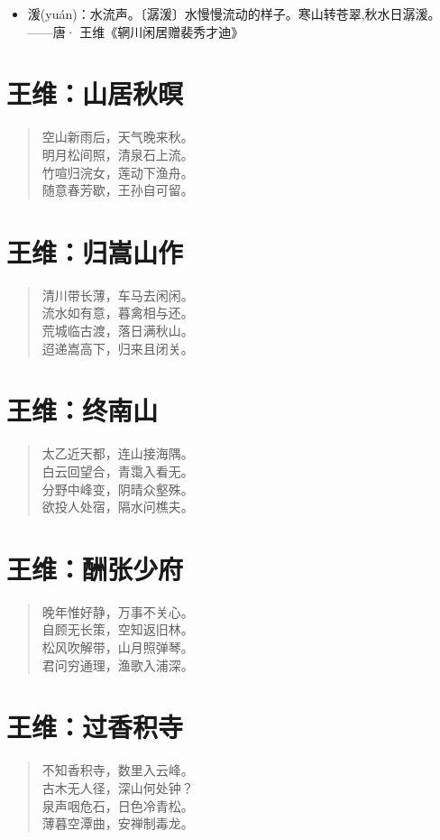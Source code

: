 \documentclass[12pt,oneside]{book}
\newenvironment{shici}{%
\begin{verse}\centering\yanti\large\hspace{12pt}}{\end{verse}}
\begin{document}
\begin{common-format}
\begin{itemize}
\item 湲(yuán)：水流声。〔潺湲〕水慢慢流动的样子。寒山转苍翠,秋水日潺湲。——唐· 王维《辋川闲居赠裴秀才迪》
\end{itemize}

\chapter{王维：山居秋暝}
\begin{shici}
空山新雨后，天气晚来秋。\\
明月松间照，清泉石上流。\\
竹喧归浣女，莲动下渔舟。\\
随意春芳歇，王孙自可留。
\end{shici}

\chapter{王维：归嵩山作}
\begin{shici}
清川带长薄，车马去闲闲。\\
流水如有意，暮禽相与还。\\
荒城临古渡，落日满秋山。\\
迢递嵩高下，归来且闭关。
\end{shici}

\chapter{王维：终南山}
\begin{shici}
太乙近天都，连山接海隅。\\
白云回望合，青霭入看无。\\
分野中峰变，阴晴众壑殊。\\
欲投人处宿，隔水问樵夫。
\end{shici}

\chapter{王维：酬张少府}
\begin{shici}
晚年惟好静，万事不关心。\\
自顾无长策，空知返旧林。\\
松风吹解带，山月照弹琴。\\
君问穷通理，渔歌入浦深。
\end{shici}

\chapter{王维：过香积寺}
\begin{shici}
不知香积寺，数里入云峰。\\
古木无人径，深山何处钟？\\
泉声咽危石，日色冷青松。\\
薄暮空潭曲，安禅制毒龙。
\end{shici}


\end{common-format}
\end{document}
